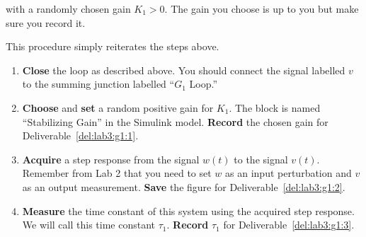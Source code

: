 \begin{center}
\end{center}
%
with a randomly chosen gain \(K_1 > 0.\)
The gain you choose is up to you but make sure you record it.
\begin{procedure}[label={proc:lab3:stabilize}]
  This procedure simply reiterates the steps above.
  \begin{enumerate}[label={(\arabic*)}]
    \item{%
      \textbf{Close} the loop as described above.
      You should connect the signal labelled \(v\) to the summing junction labelled ``\(G_1\) Loop.''%
    }
    \item{%
      \textbf{Choose} and \textbf{set} a random positive gain for \(K_1.\)
      The block is named ``Stabilizing Gain'' in the Simulink model.
      \textbf{Record} the chosen gain for Deliverable~\ref{del:lab3:g1:1}.%
    }
    \item{%
      \textbf{Acquire} a step response from the signal \(w(t)\) to the signal \(v(t).\)
      Remember from Lab 2 that you need to set \(w\) as an input perturbation and \(v\) as an output measurement.
      \textbf{Save} the figure for Deliverable~\ref{del:lab3:g1:2}.%
    }
    \item{%
      \textbf{Measure} the time constant of this system using the acquired step response. We will call this time constant \(\tau_1.\)
      \textbf{Record} \(\tau_1\) for Deliverable~\ref{del:lab3:g1:3}.%
    }
  \end{enumerate}
\end{procedure}

